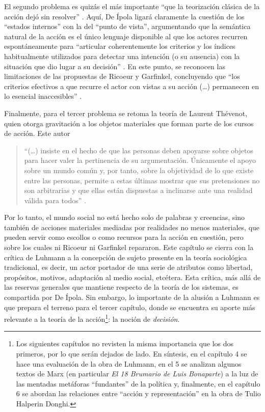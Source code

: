 {El segundo problema es quizás el más importante \enquote{que la teorización clásica de la acción dejó sin resolver} \parencite[47]{1600-DEIPOLA2001}. Aquí, De Ípola ligará claramente la cuestión de los \enquote{estados internos} con la del \enquote{punto de vista}, argumentando que la semántica natural de la acción es el único lenguaje disponible al que los actores recurren espontáneamente para \enquote{articular coherentemente los criterios y los índices habitualmente utilizados para detectar una intención (o su ausencia) con la situación que dio lugar a su decisión} \parencite[50]{1600-DEIPOLA2001}. En este punto, se reconocen las limitaciones de las propuestas de Ricoeur y Garfinkel, concluyendo que \enquote{los criterios efectivos a que recurre el actor con vistas a su acción (\dots) permanecen en lo esencial inaccesibles} \parencite[52]{1600-DEIPOLA2001}.

Finalmente, para el tercer problema se retoma la teoría de Laurent Thévenot, quien otorga gravitación a los objetos materiales que forman parte de los cursos de acción. Este autor

\begin{quote}
\enquote{(\dots) insiste en el hecho de que las personas deben apoyarse sobre objetos para hacer valer la pertinencia de su argumentación. Únicamente el apoyo sobre un mundo común y, por tanto, sobre la objetividad de lo que existe entre las personas, permite a estas últimas mostrar que sus pretensiones no son arbitrarias y que ellas están dispuestas a inclinarse ante una realidad válida para todos} \parencite[52]{1600-DEIPOLA2001}.
\end{quote}

Por lo tanto, el mundo social no está hecho solo de palabras y creencias, sino también de acciones materiales mediadas por realidades no menos materiales, que pueden servir como escollos o como recursos para la acción en cuestión, pero sobre los cuales ni Ricoeur ni Garfinkel repararon. Este capítulo se cierra con la crítica de Luhmann a la concepción de sujeto presente en la teoría sociológica tradicional, es decir, un actor portador de una serie de atributos como libertad, propósitos, motivos, adaptación al medio social, etcétera. Esta crítica, más allá de las reservas generales que mantiene respecto de la teoría de los sistemas, es compartida por De Ípola. Sin embargo, lo importante de la alusión a Luhmann es que prepara el terreno para el tercer capítulo, donde se encuentra su aporte más relevante a la teoría de la acción\footnote{Los siguientes capítulos no revisten la misma importancia que los dos primeros, por lo que serán dejados de lado. En síntesis, en el capítulo 4 se hace una evaluación de la obra de Luhmann, en el 5 se analizan algunos textos de Marx (en particular \emph{El 18 Brumario de Luis Bonaparte}) a la luz de las mentadas metáforas \enquote{fundantes} de la política y, finalmente, en el capítulo 6 se abordan las relaciones entre \enquote{acción y representación} en la obra de Tulio Halperin Donghi.}: la noción de \emph{decisión}.

}
